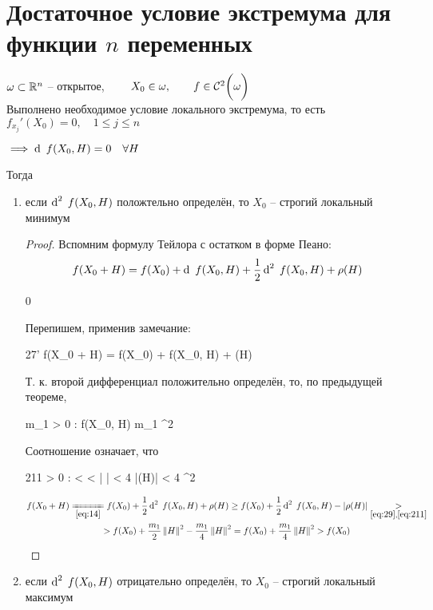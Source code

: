\section{Достаточное условие экстремума для функции \texorpdfstring{$ n $}n переменных}

\begin{theorem}
	$ \omega \sub \R^n $ -- открытое, $ \qquad X_0 \in \omega, \qquad f \in \Cont[2]\omega $ \\
	Выполнено необходимое условие локального экстремума, то есть $ f_{x_j}'(X_0) = 0, \quad 1 \le j \le n $
	\begin{remark}
		$ \implies \di f(X_0, H) = 0 \quad \forall H $
	\end{remark}
	Тогда
	\begin{enumerate}
		\item\label{th:4} если $ \di[2] f(X_0, H) $ положтельно определён, то $ X_0 $ -- строгий локальный минимум
		\begin{proof}
			Вспомним формулу Тейлора с остатком в форме Пеано:
			$$ f(X_0 + H) = f(X_0) + \di f(X_0, H) + \half \di[2] f(X_0, H) + \rho(H) $$
			\begin{equ}{28}
				   0
			\end{equ}
			Перепишем, применив замечание:
			\begin{equ}{27'}
				f(X_0 + H) = f(X_0) + \half \di[2] f(X_0, H) + \rho(H)
			\end{equ}
			Т. к. второй дифференциал положительно определён, то, по предыдущей теореме,
			\begin{equ}{29}
				\exist m_1 > 0 : \di[2] f(X_0, H) \ge m_1 \norm{H}^2
			\end{equ}
			Соотношение  означает, что
			\begin{equ}{211}
				\exist \delta > 0 :  <  < \delta \quad \bigg|  \bigg| < 4 \qquad \iff |\rho(H)| < 4 \norm{H}^2
			\end{equ}
			\begin{multline*}
				f(X_0 + H) \undereq{\eref{14}} f(X_0) + \half\di[2] f(X_0, H) + \rho(H) \ge f(X_0) + \half \di[2] f(X_0, H) - |\rho(H)| \underset{\eref{29}, \eref{211}}> \\
				> f(X_0) + \half[m_1]^2 - \frac{m_1}4^2 = f(X_0) + \frac{m_1}4\norm{H}^2 > f(X_0)
			\end{multline*}
		\end{proof}
		\item\label{th:5} если $ \di[2] f(X_0, H) $ отрицательно определён, то $ X_0 $ -- строгий локальный максимум

\end{enumerate}
\end{theorem}
